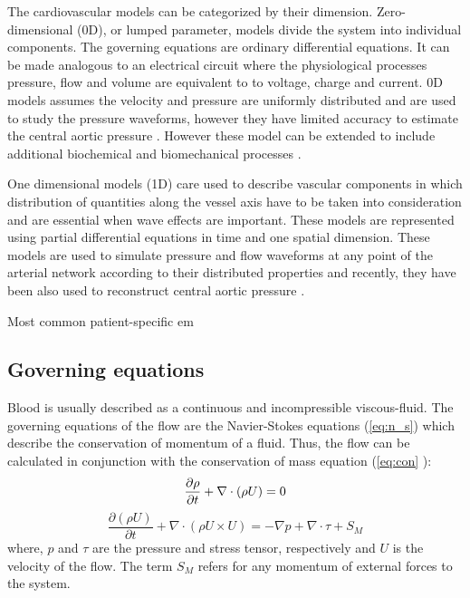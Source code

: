 The cardiovascular models can be categorized by their dimension. Zero-dimensional (0D), or lumped parameter, models divide the system into individual components. The governing equations are ordinary differential equations. It can be made analogous to an electrical circuit where the physiological processes pressure, flow and volume are equivalent to to voltage, charge and current. 0D models assumes the velocity and pressure are uniformly distributed and are used to study the pressure waveforms, however they have limited accuracy to estimate the central aortic pressure \cite{Alimohammadi2015AorticUnderstanding}. However these model can be extended to include additional biochemical and biomechanical processes \cite{Hose2019CardiovascularNext}. \par

One dimensional models (1D) care used to describe vascular components in which distribution of quantities along the vessel axis have to be taken into consideration and are essential when wave effects are important. These models are represented using partial differential equations in time and one spatial dimension. These models are used to simulate pressure and flow waveforms at any point of the arterial network according to their distributed properties and recently, they have been also used to reconstruct central aortic pressure \cite{Zhou2019APressure, Hose2019CardiovascularNext}. \par 

Most common patient-specific em

\subsection{Governing equations}
Blood is usually described as a continuous and incompressible viscous-fluid. The governing equations of the flow are the Navier-Stokes equations (\ref{eq:n_s}) which describe the conservation of momentum of a fluid. Thus, the flow can be calculated in conjunction with the conservation of mass equation (\ref{eq:con} ):
\begin{equation}
\frac{\partial \rho}{\partial t}+\nabla \cdot (\rho U) = 0 \\
\label{eq:con}
\end{equation}
\begin{equation}
\frac{\partial (\rho U)}{\partial t}+\nabla \cdot (\rho U \times U) = -\nabla p + \nabla \cdot \tau + S_{M}
\label{eq:n_s}
\end{equation}
where, $p$ and $\tau$ are the pressure and stress tensor, respectively and $U$ is the velocity of the flow. The term $S_M$ refers for any momentum of external forces to the system. \par

